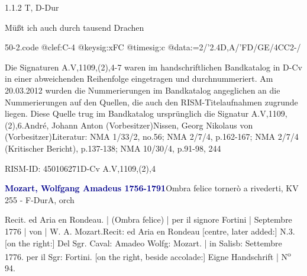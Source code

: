\documentclass[a4paper, twocolumn, 11pt]{book}
\begin{document}
\newline %
\par 1.1.2  T, D-Dur\newline \begin{footnotesize} Müßt ich auch durch tausend Drachen \end{footnotesize}  
\begin{filecontents*}{50-2.code}
@clef:C-4
@keysig:xFC
@timesig:c
@data:=2/'2.4D,A/'FD/GE/4CC2-/
\end{filecontents*}
\newline %
\par Die Signaturen A.V,1109,(2),4-7 waren im handschriftlichen Bandkatalog in D-Cv in einer abweichenden Reihenfolge eingetragen und durchnummeriert. Am 20.03.2012 wurden die Nummerierungen im Bandkatalog angeglichen an die Nummerierungen auf den Quellen, die auch den RISM-Titelaufnahmen zugrunde liegen. Diese Quelle trug im Bandkatalog ursprünglich die Signatur A.V,1109,(2),6.\newline André, Johann Anton  (Vorbesitzer)\newline Nissen, Georg Nikolaus von  (Vorbesitzer)\newline Literatur: NMA  1/33/2, no.56; NMA  2/7/4, p.162-167; NMA  2/7/4 (Kritischer Bericht), p.137-138; NMA  10/30/4, p.91-98, 244
\par RISM-ID: 450106271\newline D-Cv  A.V,1109,(2),4
\par \vspace{16pt} \textcolor{darkblue}{\textbf{Mozart, Wolfgang Amadeus  1756-1791}}\hfillplus{[51]}\newline Ombra felice tornerò a rivederti, KV 255 - F-Dur\newline A, orch
\par \begin{itshape} Recit. ed Aria en Rondeau. | (Ombra felice) | per il signore Fortini | Septembre 1776 | von | W. A. Mozart. Recit: ed Aria en Rondeau [centre, later added:] N.3. [on the right:] Del Sgr. Caval: Amadeo Wolfg: Mozart. | in Salisb: Settembre 1776. per il Sgr: Fortini. [on the right, beside accolade:] Eigne Handschrift | N\textsuperscript{o} 94.\end{itshape} 
\end{document}
